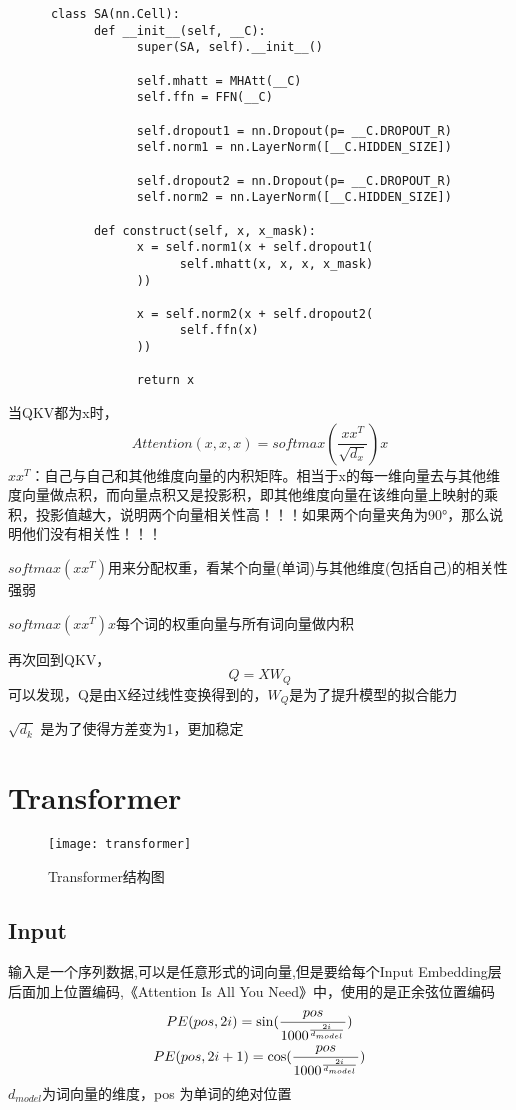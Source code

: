 \documentclass{article}
\begin{document}
\begin{sloppypar}
\begin{lstlisting}
      class SA(nn.Cell):
            def __init__(self, __C):
                  super(SA, self).__init__()

                  self.mhatt = MHAtt(__C)
                  self.ffn = FFN(__C)

                  self.dropout1 = nn.Dropout(p= __C.DROPOUT_R)
                  self.norm1 = nn.LayerNorm([__C.HIDDEN_SIZE])

                  self.dropout2 = nn.Dropout(p= __C.DROPOUT_R)
                  self.norm2 = nn.LayerNorm([__C.HIDDEN_SIZE])

            def construct(self, x, x_mask):
                  x = self.norm1(x + self.dropout1(
                        self.mhatt(x, x, x, x_mask)
                  ))

                  x = self.norm2(x + self.dropout2(
                        self.ffn(x)
                  ))

                  return x
      \end{lstlisting}

      当QKV都为x时，
      $$
            Attention(x,x,x)=softmax(\frac{xx^T}{\sqrt{d_x}})x
      $$
      $xx^T$：自己与自己和其他维度向量的内积矩阵。相当于x的每一维向量去与其他维度向量做点积，而向量点积又是投影积，即其他维度向量在该维向量上映射的乘积，投影值越大，说明两个向量相关性高！！！如果两个向量夹角为90°，那么说明他们没有相关性！！！

      $softmax(xx^T)$用来分配权重，看某个向量(单词)与其他维度(包括自己)的相关性强弱

      $softmax(xx^T)x$每个词的权重向量与所有词向量做内积

      再次回到QKV，
      $$
            Q=XW_Q
      $$
      可以发现，Q是由X经过线性变换得到的，$W_Q$是为了提升模型的拟合能力

      $\sqrt{d_k}$ 是为了使得方差变为1，更加稳定

      \section{Transformer}

      \begin{figure}[ht]
            \centering
            \texttt{[image: transformer]}
            \caption{Transformer结构图}
            \label{Transformer}
      \end{figure}

      \subsection{Input}
      输入是一个序列数据,可以是任意形式的词向量,但是要给每个Input Embedding层后面加上位置编码,《Attention Is All You Need》中，使用的是正余弦位置编码
      \begin{gather}
            PE(pos,2i)=\sin (\frac{pos}{1000^{\frac{2i}{d_{model}}}})\\
            \newline
            PE(pos,2i+1)=\cos (\frac{pos}{1000^{\frac{2i}{d_{model}}}})
      \end{gather}
      $d_{model}$为词向量的维度，pos 为单词的绝对位置


\end{sloppypar}
\end{document}
